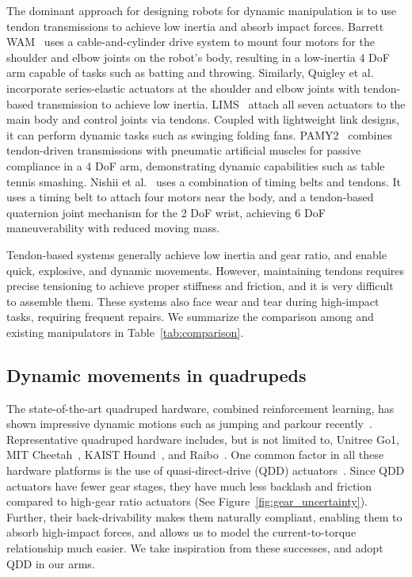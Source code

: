 The dominant approach for designing robots for dynamic manipulation is to use tendon transmissions to achieve low inertia and absorb impact forces. Barrett WAM~\cite{rooks2006harmonious} uses a cable-and-cylinder drive system to mount four motors for the shoulder and elbow joints on the robot’s body, resulting in a low-inertia 4 DoF arm capable of tasks such as batting and throwing. Similarly, Quigley et al.~\cite{quigley2011low} incorporate series-elastic actuators at the shoulder and elbow joints with tendon-based transmission to achieve low inertia. LIMS~\cite{kim2015design, song2018development} attach all seven actuators to the main body and control joints via tendons. Coupled with lightweight link designs, it can perform dynamic tasks such as swinging folding fans. PAMY2~\cite{guist2024safe} combines tendon-driven transmissions with pneumatic artificial muscles for passive compliance in a 4 DoF arm, demonstrating dynamic capabilities such as table tennis smashing. Nishii et al.~\cite{nishii2023ultra} uses a combination of timing belts and tendons. It uses a timing belt to attach four motors near the body, and a tendon-based quaternion joint mechanism for the 2 DoF wrist, achieving 6 DoF maneuverability with reduced moving mass. 

Tendon-based systems generally achieve low inertia and gear ratio, and enable quick, explosive, and dynamic movements. However, maintaining tendons requires precise tensioning to achieve proper stiffness and friction, and it is very difficult to assemble them. These systems also face wear and tear during high-impact tasks, requiring frequent repairs. We summarize the comparison among \robot and existing manipulators in Table~\ref{tab:comparison}.



\subsection{Dynamic movements in quadrupeds}
The state-of-the-art quadruped hardware, combined reinforcement learning, has shown impressive dynamic motions such as jumping and parkour recently~\cite{zhuang2023robot, cheng2024extreme, choi2023learning}. Representative quadruped hardware includes, but is not limited to, Unitree Go1, MIT Cheetah~\cite{bledt2018cheetah}, KAIST Hound~\cite{shin2022design}, and Raibo~\cite{choi2023learning}.
One common factor in all these hardware platforms is the use of quasi-direct-drive (QDD) actuators~\cite{wensing2017proprioceptive}. Since QDD actuators 
have fewer gear stages, they have much less backlash and friction compared to high-gear ratio actuators (See Figure~\ref{fig:gear_uncertainty}). Further, their back-drivability makes them naturally compliant, enabling them to absorb high-impact forces, and allows us to model the current-to-torque relationship much easier. We take inspiration from these successes, and adopt QDD in our arms.



